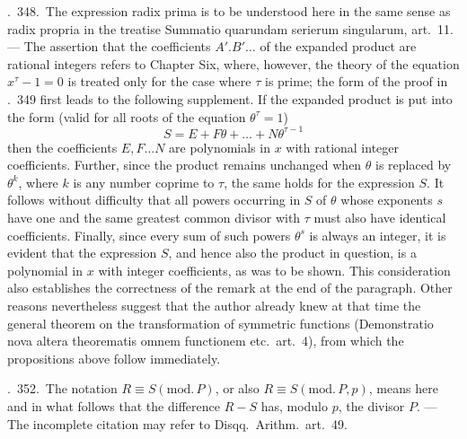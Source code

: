 \textsection.\ 348.\ The expression radix prima is to be understood here in the same sense as radix propria in the treatise Summatio quarundam serierum singularum, art.\ 11. --- The assertion that the coefficients $A'.B'\ldots$ of the expanded product are rational integers refers to Chapter Six, where, however, the theory of the equation $x^\tau-1=0$ is treated only for the case where $\tau$ is prime; the form of the proof in \textsection.\ 349 first leads to the following supplement. If the expanded product is put into the form (valid for all roots of the equation $\theta^\tau=1$)
\[
S=E+F\theta+\ldots+N\theta^{\tau-1}
\]
then the coefficients $E,F\ldots N$ are polynomials in $x$ with rational integer coefficients. Further, since the product remains unchanged when $\theta$ is replaced by $\theta^k$, where $k$ is any number coprime to $\tau$, the same holds for the expression $S$. It follows without difficulty that all powers occurring in $S$ of $\theta$ whose exponents $s$ have one and the same greatest common divisor with $\tau$ must also have identical coefficients. Finally, since every sum of such powers $\theta^s$ is always an integer, it is evident that the expression $S$, and hence also the product in question, is a polynomial in $x$ with integer coefficients, as was to be shown. This consideration also establishes the correctness of the remark at the end of the paragraph. Other reasons nevertheless suggest that the author already knew at that time the general theorem on the transformation of symmetric functions (Demonstratio nova altera theorematis omnem functionem etc.\ art.\ 4), from which the propositions above follow immediately.

\textsection.\ 352.\ The notation $R\equiv S(\mathrm{mod.}\,P)$, or also $R\equiv S(\mathrm{mod.}\,P,p)$, means here and in what
follows that the difference $R-S$ has, modulo $p$, the divisor $P$. --- The incomplete citation may refer to Disqq.\ Arithm.\ art.\ 49.

